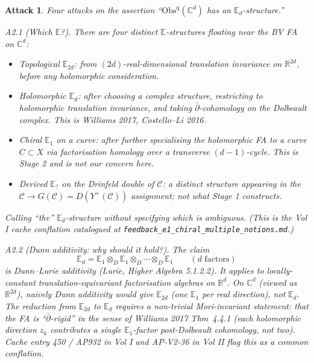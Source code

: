 \documentclass[11pt]{article}
\newtheorem*{attack}{Attack}
\theoremstyle{definition}
\providecommand{\CC}{\mathbb{C}}
\providecommand{\RR}{\mathbb{R}}
\providecommand{\cC}{\mathcal{C}}
\providecommand{\Obs}{\mathrm{Obs}}
\begin{document}
\begin{attack}
Four attacks on the assertion ``$\Obs^{\mathrm{q}}(\CC^d)$ has an
$\mathbb{E}_d$-structure.''

\emph{A2.1 (Which $\mathbb{E}$?).} There are four distinct
$\mathbb{E}$-structures floating near the BV FA on $\CC^d$:
\begin{itemize}[leftmargin=2em]
  \item[(i)] Topological $\mathbb{E}_{2d}$: from $(2d)$-real-dimensional
             translation invariance on $\RR^{2d}$, before any
             holomorphic consideration.
  \item[(ii)] Holomorphic $\mathbb{E}_d$: after choosing a complex
             structure, restricting to holomorphic translation
             invariance, and taking $\bar\partial$-cohomology on the
             Dolbeault complex. This is Williams 2017, Costello--Li 2016.
  \item[(iii)] Chiral $\mathbb{E}_1$ on a curve: after further
              specialising the holomorphic FA to a curve $C \subset X$
              via factorisation homology over a transverse $(d-1)$-cycle.
              This is Stage 2 and is not our concern here.
  \item[(iv)] Derived $\mathbb{E}_{?}$ on the Drinfeld double of $\cC$:
              a distinct structure appearing in the $\cC\to G(\cC) =
              D(Y^+(\cC))$ assignment; \emph{not} what Stage 1
              constructs.
\end{itemize}
Calling ``the'' $\mathbb{E}_d$-structure without specifying which is
ambiguous. (This is the Vol I cache conflation catalogued at
\texttt{feedback\_e1\_chiral\_multiple\_notions.md}.)

\emph{A2.2 (Dunn additivity: why should it hold?).} The claim
\[
  \mathbb{E}_d = \mathbb{E}_1 \otimes_D \mathbb{E}_1 \otimes_D \cdots \otimes_D \mathbb{E}_1
  \qquad (d \text{ factors})
\]
is Dunn--Lurie additivity (Lurie, \emph{Higher Algebra} 5.1.2.2). It
applies to locally-constant translation-equivariant factorisation
algebras on $\RR^d$. On $\CC^d$ (viewed as $\RR^{2d}$), naively Dunn
additivity would give $\mathbb{E}_{2d}$ (one $\mathbb{E}_1$ per real
direction), not $\mathbb{E}_d$. The reduction from $\mathbb{E}_{2d}$
to $\mathbb{E}_d$ requires a non-trivial Mori-invariant statement:
that the FA is ``$\bar\partial$-rigid'' in the sense of Williams 2017
Thm~4.4.1 (each holomorphic direction $z_k$ contributes a single
$\mathbb{E}_1$-factor post-Dolbeault cohomology, not two). Cache entry
450 / AP932 in Vol I and AP-V2-36 in Vol II flag this as a common
conflation.


\end{attack}
\end{document}
